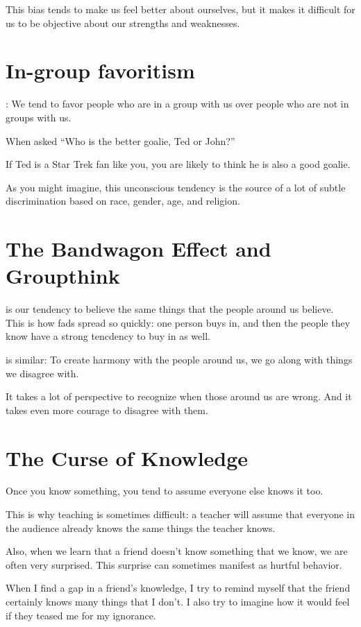 This bias tends to make us feel better about ourselves, but it makes it
difficult for us to be objective about our strengths and weaknesses.

\section{In-group favoritism}

: We tend to favor people who are in
a group with us over people who are not in groups with us.

When asked ``Who is the better goalie, Ted or John?''

If Ted is a Star Trek fan like you, you are likely to think he is also
a good goalie.

As you might imagine, this unconscious tendency is the source of a lot
of subtle discrimination based on race, gender, age, and religion.

\section{The Bandwagon Effect and Groupthink}

 is our tendency to believe the same
things that the people around us believe. This is how fads spread so
quickly: one person buys in, and then the people they know have a
strong tencdency to buy in as well.

 is similar: To create harmony with the
people around us, we go along with things we disagree with.

It takes a lot of perspective to recognize when those around us are
wrong. And it takes even more courage to disagree with them.

\section{The Curse of Knowledge}

Once you know something, you tend to assume everyone else knows it too.

This is why teaching is sometimes difficult: a teacher will assume
that everyone in the audience already knows the same things the
teacher knows.

Also, when we learn that a friend doesn't know something that we know,
we are often very surprised.  This surprise can sometimes manifest as
hurtful behavior.

When I find a gap in a friend's knowledge, I try to remind myself that
the friend certainly knows many things that I don't.  I also try to
imagine how it would feel if they teased me for my ignorance.

